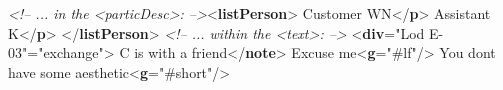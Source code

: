 \begin{shaded}
\textit{<!-- ... in the <particDesc>: -->}{<\textbf{listPerson}>}\mbox{}\newline 
{}\mbox{}\newline 
\hspace*{1em}Customer WN{</\textbf{p}>}\mbox{}\newline 
{}\mbox{}\newline 
{}\mbox{}\newline 
\hspace*{1em}Assistant K{</\textbf{p}>}\mbox{}\newline 
{}\mbox{}\newline 
{</\textbf{listPerson}>}\mbox{}\newline 
\textit{<!-- ... within the <text>: -->}\mbox{}\newline 
{<\textbf{div}\hspace*{1em}{n}="{Lod E-03}"\hspace*{1em}{type}="{exchange}">}\mbox{}\newline 
{}C is with a friend{</\textbf{note}>}\mbox{}\newline 
{}\mbox{}\newline 
\hspace*{1em}Excuse me{<\textbf{g}\hspace*{1em}{ref}="{\#lf}"/>}\mbox{}\newline 
\hspace*{1em}\mbox{}\newline 
\hspace*{1em} You dont have some\mbox{}\newline 
\hspace*{1em}\hspace*{1em} aesthetic{<\textbf{g}\hspace*{1em}{ref}="{\#short}"/>}\mbox{}\newline 

\end{shaded}
